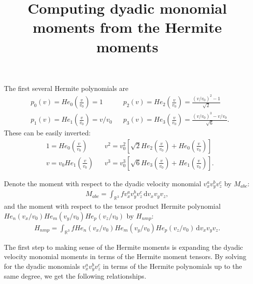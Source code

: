\documentclass{article}
\title{Computing dyadic monomial moments from the Hermite moments}
\begin{document}
\maketitle

The first several Hermite polynomials are
\begin{align*}
&p_0(v) = He_0 \left( \frac{v}{v_0} \right) = 1 
&&p_2(v) = He_2 \left( \frac{v}{v_0} \right) = \frac{(v/v_0)^2 - 1}{\sqrt{2}} \\
&p_1(v) = He_1 \left( \frac{v}{v_0} \right) = v/v_0
&&p_3(v) = He_3 \left( \frac{v}{v_0} \right) = \frac{(v/v_0)^3 - v/v_0}{\sqrt{6}}.
\end{align*}
These can be easily inverted:
\begin{align*}
&1 = He_0 \left( \frac{v}{v_0} \right)
&&v^2 = v_0^2 \left[ \sqrt{2} He_2 \left( \frac{v}{v_0} \right) + He_0 \left( \frac{v}{v_0} \right)  \right] \\
&v = v_0 He_1 \left( \frac{v}{v_0} \right)
&&v^3 = v_0^3 \left[ \sqrt{6} He_3 \left( \frac{v}{v_0} \right) + He_1 \left( \frac{v}{v_0} \right)  \right].
\end{align*}

Denote the moment with respect to the dyadic velocity monomial $v_x^a v_y^b v_z^c$ by $M_{abc}$:
\begin{align*}
    M_{abc} = \int_{\mathbb{R}^3} f v_x^a v_y^b v_z^c \, \mathrm{d} v_x v_y v_z,
\end{align*}
and the moment with respect to the tensor product Hermite polynomial $He_n(v_x/v_0) He_m(v_y/v_0) He_p(v_z/v_0)$ by $H_{nmp}$:
\begin{align*}
    H_{nmp} = \int_{\mathbb{R}^3} f He_n(v_x/v_0) He_m(v_y/v_0) He_p(v_z/v_0) \, \mathrm{d} v_x v_y v_z.
\end{align*}

The first step to making sense of the Hermite moments is expanding the dyadic velocity monomial moments in terms of the Hermite moment tensors.
By solving for the dyadic monomials $v_x^a v_y^b v_z^c$ in terms of the Hermite polynomials up to the same degree, we get the following relationships.
\end{document}
